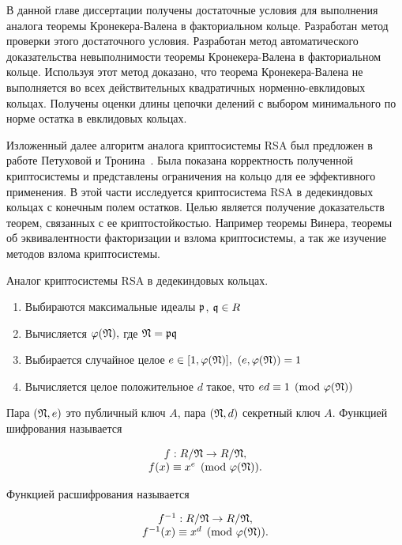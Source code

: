 \documentclass[_00_autoref.tex]{subfiles}
\begin{document}
В данной главе диссертации получены достаточные условия для выполнения аналога теоремы Кронекера-Валена в факториальном кольце.
Разработан метод проверки этого достаточного условия.
Разработан метод автоматического доказательства невыполнимости теоремы Кронекера-Валена в факториальном кольце.
Используя этот метод доказано, что теорема Кронекера-Валена не выполняется во всех действительных квадратичных норменно-евклидовых кольцах.
Получены оценки длины цепочки делений с выбором минимального по норме остатка в евклидовых кольцах.


Изложенный далее алгоритм аналога криптосистемы RSA был предложен в работе Петуховой и Тронина~\cite{source:Petukhova}.
Была показана корректность полученной криптосистемы и представлены ограничения  на кольцо для ее эффективного применения.
В этой части исследуется криптосистема RSA в дедекиндовых кольцах с конечным полем остатков.
Целью является получение доказательств теорем, связанных с ее криптостойкостью.
Например теоремы Винера, теоремы об эквивалентности факторизации и взлома криптосистемы, а так же изучение методов взлома криптосистемы.

\begin{algorithm}\label{algorithm:RSA_in_dedekind}
    Аналог криптосистемы RSA в дедекиндовых кольцах.

    \begin{enumerate}
        \item Выбираются максимальные идеалы $\mathfrak{p}$, $\mathfrak{q}\in R$

        \item Вычисляется $\varphi(\mathfrak{N}),$ где $\mathfrak{N} = \mathfrak{p} \mathfrak{q}$

        \item Выбирается случайное целое $e \in [1, \varphi(\mathfrak{N})],$ $(e, \varphi(\mathfrak{N}))=1$

        \item Вычисляется целое положительное $d$ такое, что $ed \equiv 1 \pmod{\varphi(\mathfrak{N})}$
    \end{enumerate}

    Пара $(\mathfrak{N}, e)$ это публичный ключ $A$, пара $(\mathfrak{N}, d)$ секретный ключ $A$.
    Функцией шифрования называется

    \begin{equation*}
        \begin{array}{c}
            f: R/\mathfrak{N} \to R/\mathfrak{N},\\
            f(x) \equiv x^{e} \pmod{\varphi(\mathfrak{N})}.
        \end{array}
    \end{equation*}

    Функцией расшифрования называется

    \begin{equation*}
        \begin{array}{c}
            f^{-1}: R/\mathfrak{N} \to R/\mathfrak{N},\\
            f^{-1}(x) \equiv x^{d}\pmod{\varphi(\mathfrak{N})}.
        \end{array}
    \end{equation*}
\end{algorithm}
\end{document}
